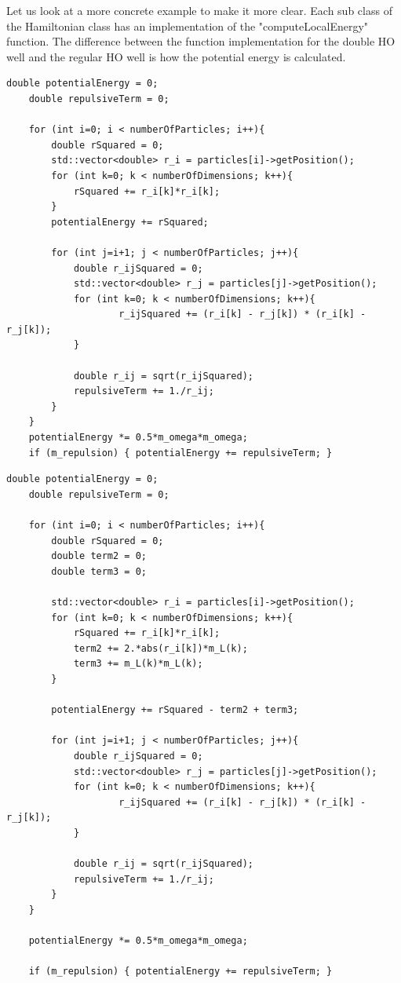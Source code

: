 \documentclass[../main.tex]{subfiles}
\begin{document}
Let us look at a more concrete example to make it more clear. Each sub class of the Hamiltonian class has an implementation of the "computeLocalEnergy" function. The difference between the function implementation for the double HO well and the regular HO well is how the potential energy is calculated.

\lstset{language=c++}
\begin{lstlisting}[label={lst:Regular Well Potential}, caption={Potential energy calculation for the regular harmonic oscillator well sub class of the Hamiltonian class.}]
double potentialEnergy = 0;
    double repulsiveTerm = 0;

    for (int i=0; i < numberOfParticles; i++){
        double rSquared = 0;
        std::vector<double> r_i = particles[i]->getPosition();
        for (int k=0; k < numberOfDimensions; k++){
            rSquared += r_i[k]*r_i[k];
        }
        potentialEnergy += rSquared;

        for (int j=i+1; j < numberOfParticles; j++){
            double r_ijSquared = 0;
            std::vector<double> r_j = particles[j]->getPosition();
            for (int k=0; k < numberOfDimensions; k++){
                    r_ijSquared += (r_i[k] - r_j[k]) * (r_i[k] - r_j[k]);
            }

            double r_ij = sqrt(r_ijSquared);
            repulsiveTerm += 1./r_ij;
        }
    }
    potentialEnergy *= 0.5*m_omega*m_omega;
    if (m_repulsion) { potentialEnergy += repulsiveTerm; }
\end{lstlisting}

\lstset{language=c++}
\begin{lstlisting}[label={lst:Double Well Potential}, caption={Potential energy calculation for the double harmonic oscillator well sub class of the Hamiltonian class.}]
double potentialEnergy = 0;
    double repulsiveTerm = 0;

    for (int i=0; i < numberOfParticles; i++){
        double rSquared = 0;
        double term2 = 0;
        double term3 = 0;

        std::vector<double> r_i = particles[i]->getPosition();
        for (int k=0; k < numberOfDimensions; k++){
            rSquared += r_i[k]*r_i[k];
            term2 += 2.*abs(r_i[k])*m_L(k);
            term3 += m_L(k)*m_L(k);
        }

        potentialEnergy += rSquared - term2 + term3;

        for (int j=i+1; j < numberOfParticles; j++){
            double r_ijSquared = 0;
            std::vector<double> r_j = particles[j]->getPosition();
            for (int k=0; k < numberOfDimensions; k++){
                    r_ijSquared += (r_i[k] - r_j[k]) * (r_i[k] - r_j[k]);
            }

            double r_ij = sqrt(r_ijSquared);
            repulsiveTerm += 1./r_ij;
        }
    }

    potentialEnergy *= 0.5*m_omega*m_omega;

    if (m_repulsion) { potentialEnergy += repulsiveTerm; }
\end{lstlisting}
\end{document}
